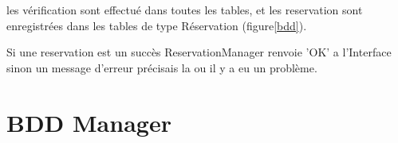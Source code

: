 		les vérification sont effectué dans toutes les tables, et les reservation sont
		enregistrées dans les tables de type Réservation (figure\ref{bdd}).
		
		Si une reservation est un succès ReservationManager renvoie 'OK' a l'Interface
		sinon un message d'erreur précisais la ou il y a eu un problème.

\section{BDD Manager}

\clearpage




















